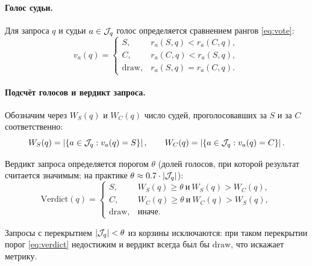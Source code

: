 \paragraph{Голос судьи.}
Для запроса $q$ и судьи $a \in \mathcal{J}_q$ голос определяется сравнением
рангов \eqref{eq:vote}:
\begin{equation}
    \label{eq:vote}
    v_a(q) =
    \begin{cases}
        S, & r_a(S,q) < r_a(C,q), \\
        C, & r_a(C,q) < r_a(S,q), \\
        \mathrm{draw}, & r_a(S,q) = r_a(C,q).
    \end{cases}
\end{equation}

\paragraph{Подсчёт голосов и вердикт запроса.}
Обозначим через $W_S(q)$ и $W_C(q)$ число судей, проголосовавших за
$S$ и за $C$ соответственно:
\begin{equation}
    \label{eq:winvotes}
    W_S(q) = \left\lvert\{a \in \mathcal{J}_q : v_a(q) = S\}\right\rvert, \qquad
    W_C(q) = \left\lvert\{a \in \mathcal{J}_q : v_a(q) = C\}\right\rvert.
\end{equation}

Вердикт запроса определяется порогом $\theta$ (долей голосов, при
которой результат считается значимым; на практике
$\theta \approx 0.7 \cdot \left\lvert\mathcal{J}_q\right\rvert$):
\begin{equation}
    \label{eq:verdict}
    \mathrm{Verdict}(q) =
    \begin{cases}
        S, & W_S(q) \ge \theta \ \text{и} \ W_S(q) > W_C(q), \\
        C, & W_C(q) \ge \theta \ \text{и} \ W_C(q) > W_S(q), \\
        \mathrm{draw}, & \text{иначе}.
    \end{cases}
\end{equation}

Запросы с перекрытием $\left\lvert\mathcal{J}_q\right\rvert < \theta$ из корзины исключаются:
при таком перекрытии порог \eqref{eq:verdict} недостижим и вердикт
всегда был бы $\mathrm{draw}$, что искажает метрику.

